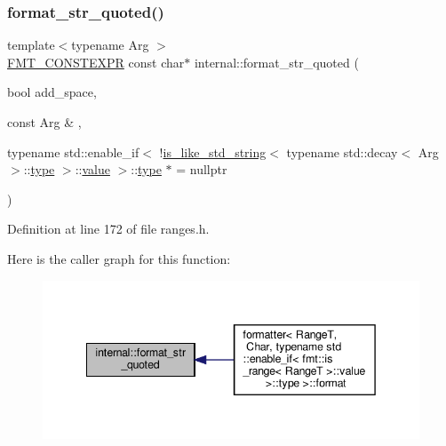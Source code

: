 \subsubsection{\texorpdfstring{format\+\_\+str\+\_\+quoted()}{format\_str\_quoted()}\hspace{0.1cm}{\footnotesize\ttfamily [1/6]}}
{\footnotesize\ttfamily template$<$typename Arg $>$ \\
\hyperlink{core_8h_a69201cb276383873487bf68b4ef8b4cd}{F\+M\+T\+\_\+\+C\+O\+N\+S\+T\+E\+X\+PR} const char$\ast$ internal\+::format\+\_\+str\+\_\+quoted (\begin{DoxyParamCaption}\item[{bool}]{add\+\_\+space,  }\item[{const Arg \&}]{,  }\item[{typename std\+::enable\+\_\+if$<$ !\hyperlink{classinternal_1_1is__like__std__string}{is\+\_\+like\+\_\+std\+\_\+string}$<$ typename std\+::decay$<$ Arg $>$\+::\hyperlink{namespaceinternal_a8661864098ac0acff9a6dd7e66f59038}{type} $>$\+::\hyperlink{classinternal_1_1value}{value} $>$\+::\hyperlink{namespaceinternal_a8661864098ac0acff9a6dd7e66f59038}{type} $\ast$}]{ = {\ttfamily nullptr} }\end{DoxyParamCaption})}



Definition at line 172 of file ranges.\+h.

Here is the caller graph for this function\+:
\nopagebreak
\begin{figure}[H]
\begin{center}
\leavevmode
\includegraphics[width=342pt]{namespaceinternal_ae4a81ecefd309d3f64e05535ed306514_icgraph}
\end{center}
\end{figure}
\mbox{\label{namespaceinternal_a6b6d89b287d9960295aa6a1a46300b05}} 
